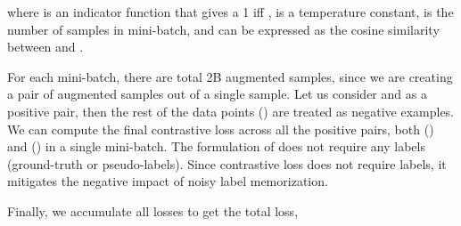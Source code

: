 \documentclass[10pt,twocolumn,letterpaper]{article}
\begin{document}
where  is an indicator function that gives a 1 iff ,  is a temperature constant,  is the number of samples in mini-batch, and  can be expressed as the cosine similarity between  and . 

For each mini-batch, there are total 2B augmented samples, since we are creating a pair of augmented samples out of a single sample.  Let us consider  and  as a positive pair, then the rest of the data points () are treated as negative examples. We can compute the final contrastive loss  across all the positive pairs, both () and () in a single mini-batch. The formulation of  does not require any labels (ground-truth or pseudo-labels). Since contrastive loss does not require labels, it mitigates the negative impact of noisy label memorization. 


\begin{table*}[t]
\centering
{}
\caption{Hyperparameter Settings for \textsc{UniCon}. Most of the parameters are the same across different datasets. This shows the general applicability of the proposed \textsc{UniCon} method.}
\label{tab:hyperparameters}
\end{table*}



Finally, we accumulate all losses to get the total loss, 
\end{document}
